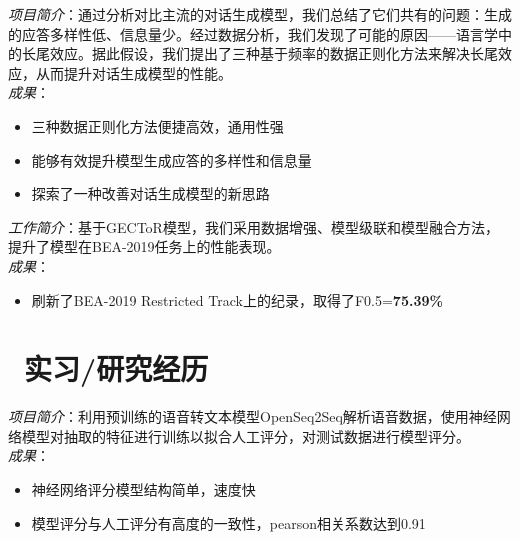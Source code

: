 \documentclass{resume}
\begin{document}
\begin{onehalfspacing}
\emph{项目简介}：通过分析对比主流的对话生成模型，我们总结了它们共有的问题：生成的应答多样性低、信息量少。经过数据分析，我们发现了可能的原因——语言学中的长尾效应。据此假设，我们提出了三种基于频率的数据正则化方法来解决长尾效应，从而提升对话生成模型的性能。
\\
\emph{成果}：
\begin{itemize}
  \item 三种数据正则化方法便捷高效，通用性强
  \item 能够有效提升模型生成应答的多样性和信息量
  \item 探索了一种改善对话生成模型的新思路
\end{itemize}
\end{onehalfspacing}


\begin{onehalfspacing}
\emph{工作简介}：基于GECToR模型，我们采用数据增强、模型级联和模型融合方法，提升了模型在BEA-2019任务上的性能表现。\\
\emph{成果}：
\begin{itemize}
  \item 刷新了BEA-2019 Restricted Track上的纪录，取得了F0.5=\textbf{75.39\%}
\end{itemize}
\end{onehalfspacing}

\section{\faUsers\ 实习/研究经历}
\begin{onehalfspacing}
\emph{项目简介}：利用预训练的语音转文本模型OpenSeq2Seq解析语音数据，使用神经网络模型对抽取的特征进行训练以拟合人工评分，对测试数据进行模型评分。\\
\emph{成果}：
\begin{itemize}
  \item 神经网络评分模型结构简单，速度快
  \item 模型评分与人工评分有高度的一致性，pearson相关系数达到0.91
\end{itemize}
\end{onehalfspacing}
\end{document}
